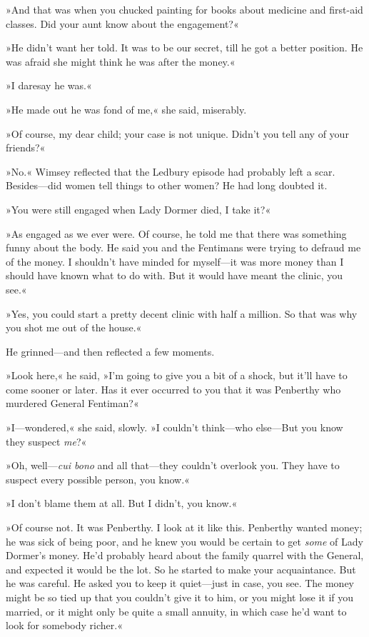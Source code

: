 »And that was when you chucked painting for books about medicine and first-aid classes. Did your aunt know about the engagement?«

»He didn't want her told. It was to be our secret, till he got a better position. He was afraid she might think he was after the money.«

»I daresay he was.«

»He made out he was fond of me,« she said, miserably.

»Of course, my dear child; your case is not unique. Didn't you tell any of your friends?«

»No.« Wimsey reflected that the Ledbury episode had probably left a scar. Besides—did women tell things to other women? He had long doubted it.

»You were still engaged when Lady Dormer died, I take it?«

»As engaged as we ever were. Of course, he told me that there was something funny about the body. He said you and the Fentimans were trying to defraud me of the money. I shouldn't have minded for myself—it was more money than I should have known what to do with. But it would have meant the clinic, you see.«

»Yes, you could start a pretty decent clinic with half a million. So that was why you shot me out of the house.«

He grinned—and then reflected a few moments.

»Look here,« he said, »I'm going to give you a bit of a shock, but it'll have to come sooner or later. Has it ever occurred to you that it was Penberthy who murdered General Fentiman?«

»I—wondered,« she said, slowly. »I couldn't think—who else—But you know they suspect \textit{me}?«

»Oh, well—\textit{cui bono} and all that—they couldn't overlook you. They have to suspect every possible person, you know.«

»I don't blame them at all. But I didn't, you know.«

»Of course not. It was Penberthy. I look at it like this. Penberthy wanted money; he was sick of being poor, and he knew you would be certain to get \textit{some} of Lady Dormer's money. He'd probably heard about the family quarrel with the General, and expected it would be the lot. So he started to make your acquaintance. But he was careful. He asked you to keep it quiet—just in case, you see. The money might be so tied up that you couldn't give it to him, or you might lose it if you married, or it might only be quite a small annuity, in which case he'd want to look for somebody richer.«

